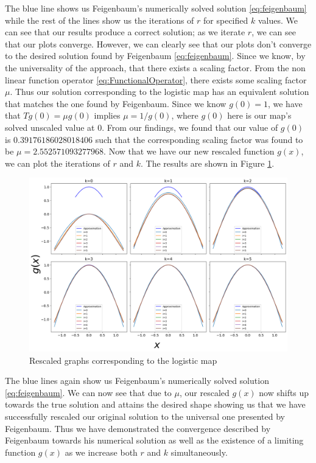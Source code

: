 \begin{exmp}
    The blue line shows us Feigenbaum's numerically solved solution \eqref{eq:feigenbaum} while the rest of the lines show us the iterations of $r$ for specified $k$ values. 
	We can see that our results produce a correct solution; as we iterate $r$, we can see that our plots converge. However, we can clearly see that our plots don't converge to the desired solution found by Feigenbaum \eqref{eq:feigenbaum}. Since we know, by the universality of the approach, that there exists a scaling factor. From the non linear function operator \eqref{eq:FunctionalOperator}, there exists some scaling factor $\mu$. Thus our solution corresponding to the logistic map has an equivalent solution that matches the one found by Feigenbaum. Since we know $g(0)=1$, we have that $Tg(0)=\mu g(0)$ implies $\mu = 1/g(0)$, where $g(0)$ here is our map's solved unscaled value at 0. From our findings, we found that our value of $g(0)$ is $0.39176186028018406$ such that the corresponding scaling factor was found to be $\mu= 2.552571093277968$. Now that we have our new rescaled function $g(x)$, we can plot the iterations of $r$ and $k$. The results are shown in Figure \ref{fig:rescaled}.
    \begin{figure}
    \centering
    \includegraphics[width=1\textwidth]{Feigenbaum Approx Graphs/Images/fiegenbaum_scaled.png}
    \caption{Rescaled graphs corresponding to the logistic map}
    \label{fig:rescaled}
\end{figure}
The blue lines again show us Feigenbaum's numerically solved solution \eqref{eq:feigenbaum}. We can now see that due to $\mu$, our rescaled $g(x)$ now shifts up towards the true solution and attains the desired shape showing us that we have successfully rescaled our original solution to the universal one presented by Feigenbaum. Thus we have demonstrated the convergence described by Feigenbaum towards his numerical solution as well as the existence of a limiting function $g(x)$ as we increase both $r$ and $k$ simultaneously. 
\end{exmp}


